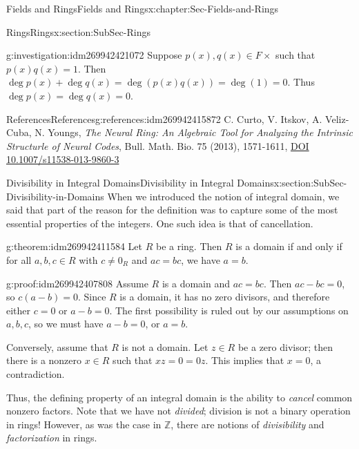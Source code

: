 \documentclass[oneside,10pt,]{book}
\numberwithin{equation}{section}
\def\Z{{\mathbb Z}}
\begin{document}
\begin{chapterptx}{Fields and Rings}{}{Fields and Rings}{}{}{x:chapter:Sec-Fields-and-Rings}
\begin{sectionptx}{Rings}{}{Rings}{}{}{x:section:SubSec-Rings}
\begin{investigation}{}{g:investigation:idm269942421072}
Suppose \(p(x),q(x)\in F\times\) such that \(p(x) q(x) = 1\). Then \(\deg p(x) + \deg q(x) = \deg(p(x) q(x)) = \deg(1) = 0\). Thus \(\deg p(x) = \deg q(x) = 0\).%
\end{investigation}
%
%
\typeout{************************************************}
\typeout{************************************************}
%
\begin{references-subsection-numberless}{References}{}{References}{}{}{g:references:idm269942415872}
C. Curto, V. Itskov, A. Veliz-Cuba, N. Youngs, \emph{The Neural Ring: An Algebraic Tool for Analyzing the Intrinsic Structurle of Neural Codes}, Bull. Math. Bio. 75 (2013), 1571-1611, \href{https://doi.org/10.1007/s11538-013-9860-3}{DOI 10.1007\slash{}s11538-013-9860-3}\end{references-subsection-numberless}
\end{sectionptx}
%
%
\typeout{************************************************}
\typeout{************************************************}
%
\begin{sectionptx}{Divisibility in Integral Domains}{}{Divisibility in Integral Domains}{}{}{x:section:SubSec-Divisibility-in-Domains}
When we introduced the notion of integral domain, we said that part of the reason for the definition was to capture some of the most essential properties of the integers. One such idea is that of cancellation.%
\begin{theorem}{}{}{g:theorem:idm269942411584}%
Let \(R\) be a ring. Then \(R\) is a domain if and only if for all \(a,b,c\in R\) with \(c\ne 0_R\) and \(ac = bc\), we have \(a = b\).%
\end{theorem}
\begin{proofptx}{}{g:proof:idm269942407808}
Assume \(R\) is a domain and \(ac = bc\). Then \(ac - bc = 0\), so \(c(a-b) = 0\). Since \(R\) is a domain, it has no zero divisors, and therefore either \(c = 0\) or \(a-b=0\). The first possibility is ruled out by our assumptions on \(a,b,c\), so we must have \(a-b = 0\), or \(a =b\).%
\par
Conversely, assume that \(R\) is not a domain. Let \(z\in R\) be a zero divisor; then there is a nonzero \(x\in R\) such that \(xz = 0 = 0 z\). This implies that \(x = 0\), a contradiction.%
\end{proofptx}
Thus, the defining property of an integral domain is the ability to \emph{cancel} common nonzero factors. Note that we have not \emph{divided}; division is not a binary operation in rings! However, as was the case in \(\Z\), there are notions of \emph{divisibility} and \emph{factorization} in rings.%

\end{sectionptx}
\end{chapterptx}
\end{document}
